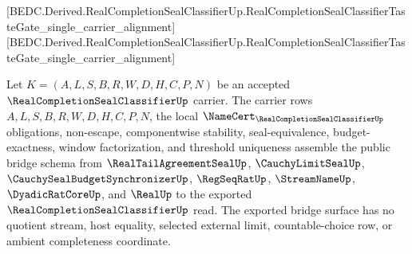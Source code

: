 [BEDC.Derived.RealCompletionSealClassifierUp.RealCompletionSealClassifierTasteGate\_single\_carrier\_alignment]
[BEDC.Derived.RealCompletionSealClassifierUp.RealCompletionSealClassifierTasteGate\_single\_carrier\_alignment]

\begin{theorem}
\label{thm:real-completion-seal-classifier-public-bridge-schema}
Let $K=(A,L,S,B,R,W,D,H,C,P,N)$ be an accepted $\RealCompletionSealClassifierUp$ carrier. The carrier rows $A,L,S,B,R,W,D,H,C,P,N$, the local $\NameCert_{\RealCompletionSealClassifierUp}$ obligations, non-escape, componentwise stability, seal-equivalence, budget-exactness, window factorization, and threshold uniqueness assemble the public bridge schema from $\RealTailAgreementSealUp$, $\CauchyLimitSealUp$, $\CauchySealBudgetSynchronizerUp$, $\RegSeqRatUp$, $\StreamNameUp$, $\DyadicRatCoreUp$, and $\RealUp$ to the exported $\RealCompletionSealClassifierUp$ read. The exported bridge surface has no quotient stream, host equality, selected external limit, countable-choice row, or ambient completeness coordinate.
\end{theorem}

